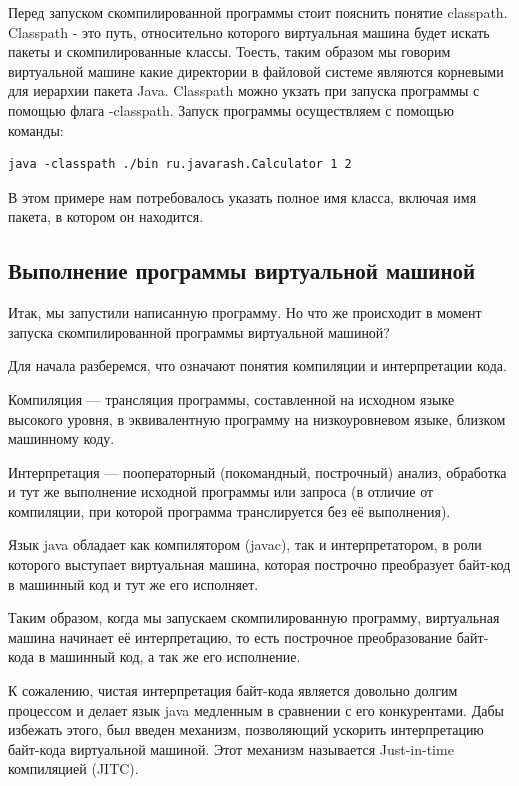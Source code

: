 \documentclass[]{scrartcl}
\begin{document}
Перед запуском скомпилированной программы стоит пояснить понятие classpath. Classpath - это путь, относительно которого виртуальная машина будет искать пакеты и скомпилированные классы. Тоесть, таким образом  мы говорим виртуальной машине какие директории в файловой системе являются корневыми для иерархии пакета Java. Classpath можно укзать при запуска программы с помощью флага -classpath. Запуск программы осуществляем с помощью команды:

\begin{lstlisting}
java -classpath ./bin ru.javarash.Calculator 1 2
\end{lstlisting}

В этом примере нам потребовалось указать полное имя класса, включая имя пакета, в котором он находится.

\subsection{Выполнение программы виртуальной машиной}

Итак, мы запустили написанную программу. Но что же происходит в момент запуска скомпилированной программы виртуальной машиной?

Для начала разберемся, что означают понятия компиляции и интерпретации кода.

Компиляция — трансляция программы, составленной на исходном языке высокого уровня, в эквивалентную программу на низкоуровневом языке, близком машинному коду. 

Интерпретация — пооператорный (покомандный, построчный) анализ, обработка и тут же выполнение исходной программы или запроса (в отличие от компиляции, при которой программа транслируется без её выполнения).

Язык java обладает как компилятором (javac), так и интерпретатором, в роли которого выступает виртуальная машина, которая построчно преобразует байт-код в машинный код и тут же его исполняет. 

Таким образом, когда мы запускаем скомпилированную программу, виртуальная машина начинает её интерпретацию, то есть построчное преобразование байт-кода в машинный код, а так же его исполнение.

К сожалению, чистая интерпретация байт-кода является довольно долгим процессом и делает язык java медленным в сравнении с его конкурентами. Дабы избежать этого, был введен механизм, позволяющий ускорить интерпретацию байт-кода виртуальной машиной. Этот механизм называется Just-in-time компиляцией (JITC).
\end{document}
